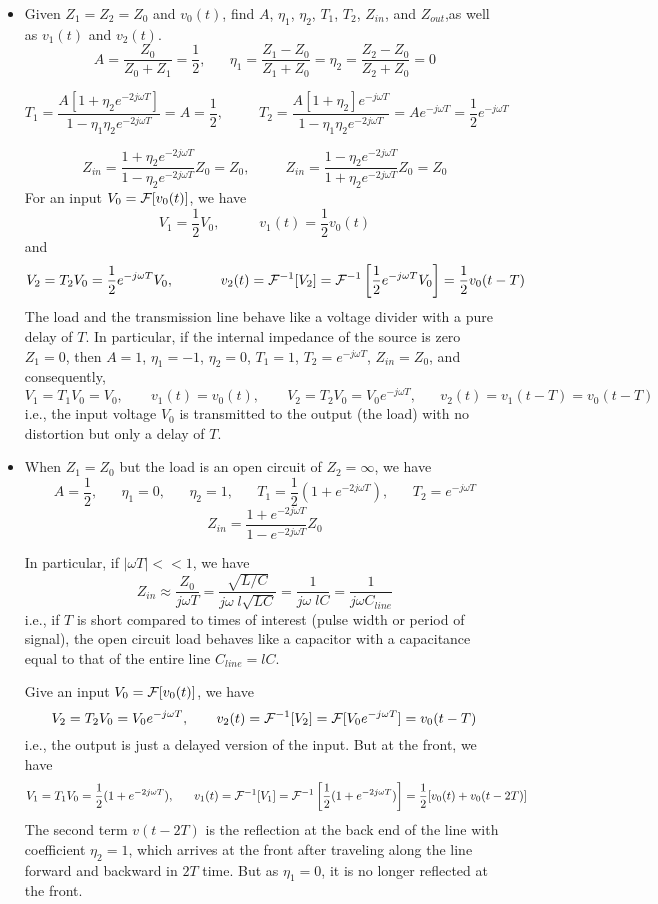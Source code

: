 \begin{itemize}
\item Given $Z_1=Z_2=Z_0$ and $v_0(t)$, find $A$, $\eta_1$, $\eta_2$, $T_1$, 
  $T_2$, $Z_{in}$, and $Z_{out}$,as well as $v_1(t)$ and $v_2(t)$.
  \[ A=\frac{Z_0}{Z_0+Z_1}=\frac{1}{2},\;\;\;\;\;\;
  \eta_1=\frac{Z_1-Z_0}{Z_1+Z_0}=\eta_2=\frac{Z_2-Z_0}{Z_2+Z_0}=0 \]

  \[ T_1=\frac{A[1+\eta_2e^{-2j\omega T}]}{1-\eta_1\eta_2e^{-2j\omega T}}=A=\frac{1}{2},
  \;\;\;\;\;\;\;\;\;T_2=\frac{A[1+\eta_2]e^{-j\omega T}}{1-\eta_1\eta_2e^{-2j\omega T}}
  =Ae^{-j\omega T}=\frac{1}{2}e^{-j\omega T}	\]

  \[ Z_{in}=\frac{1+\eta_2e^{-2j\omega T}}{1-\eta_2e^{-2j\omega T}}Z_0=Z_0,
  \;\;\;\;\;\;\;\;\;
  Z_{in}=\frac{1-\eta_2e^{-2j\omega T}}{1+\eta_2e^{-2j\omega T}}Z_0=Z_0 \]
  For an input $V_0={\cal F}[v_0(t)]$, we have
  \[	V_1=\frac{1}{2}V_0,\;\;\;\;\;\;\;\;\;\;v_1(t)=\frac{1}{2}v_0(t) \]
  and
  \[	V_2=T_2V_0=\frac{1}{2}e^{-j\omega T}V_0,\;\;\;\;\;\;\;\;\;\;\;\;
  v_2(t)={\cal F}^{-1}[V_2]={\cal F}^{-1}\left[\frac{1}{2}e^{-j\omega T}V_0\right]
  =\frac{1}{2}v_0(t-T)	\]
  The load and the transmission line behave like a voltage divider with a 
  pure delay of $T$. In particular, if the internal impedance of the source 
  is zero $Z_1=0$, then $A=1$, $\eta_1=-1$, $\eta_2=0$, $T_1=1$, $T_2=e^{-j\omega T}$,
  $Z_{in}=Z_0$, and consequently, 
  \[	V_1=T_1V_0=V_0,\;\;\;\;\;\;\;v_1(t)=v_0(t),\;\;\;\;\;\;\;
  V_2=T_2V_0=V_0e^{-j\omega T},\;\;\;\;\;\; v_2(t)=v_1(t-T)=v_0(t-T)	\]
  i.e., the input voltage $V_0$ is transmitted to the output (the load) with
  no distortion but only a delay of $T$. 

\item When $Z_1=Z_0$ but the load is an open circuit of $Z_2=\infty$, we have
  \[	A=\frac{1}{2},\;\;\;\;\;\;\eta_1=0,\;\;\;\;\;\;\eta_2=1,
  \;\;\;\;\;\;T_1=\frac{1}{2}(1+e^{-2j\omega T}),\;\;\;\;\;\;T_2=e^{-j\omega T}	\]
  \[ Z_{in}=\frac{1+e^{-2j\omega T}}{1-e^{-2j\omega T}}Z_0 \]
  
  In particular, if $|\omega T| << 1$, we have
  \[ Z_{in}\approx \frac{Z_0}{j\omega T}=\frac{\sqrt{L/C}}{j\omega\;l\sqrt{LC}}
  =\frac{1}{j\omega\;lC}=\frac{1}{j\omega C_{line}}	\]
  i.e., if $T$ is short compared to times of interest (pulse width or
  period of signal), the open circuit load behaves like a capacitor with
  a capacitance equal to that of the entire line $C_{line}=lC$.

  Give an input $V_0={\cal F}[v_0(t)]$, we have
  \[	V_2=T_2V_0=V_0 e^{-j\omega T},\;\;\;\;\;\;\;
  v_2(t)={\cal F}^{-1}[V_2]={\cal F}[V_0 e^{-j\omega T}]=v_0(t-T)	\]
  i.e., the output is just a delayed version of the input. But at the front,
  we have
  \[	V_1=T_1V_0=\frac{1}{2}(1+e^{-2j\omega T}),\;\;\;\;\;\;
  v_1(t)={\cal F}^{-1}[V_1]={\cal F}^{-1}\left[\frac{1}{2}(1+e^{-2j\omega T})\right]
  =\frac{1}{2}[v_0(t)+v_0(t-2T)]	\]
  The second term $v(t-2T)$ is the reflection at the back end of the line 
  with coefficient $\eta_2=1$, which arrives at the front after traveling
  along the line forward and backward in $2T$ time. But as $\eta_1=0$, it 
  is no longer reflected at the front.


\end{itemize}
